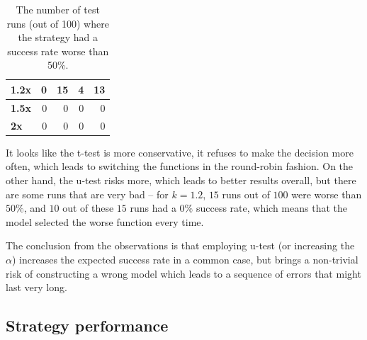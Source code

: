 \begin{table}[h!]
\begin{tabular}{|l|r|r|r|r|}
		\textbf{1.2x}  & 0                                                                                 & 15                                                                                & 4                                                                                 & 13                                                                                \\ \hline
		\textbf{1.5x}  & 0                                                                                 & 0                                                                                 & 0                                                                                 & 0                                                                                 \\ \hline
		\textbf{2x}    & 0                                                                                 & 0                                                                                 & 0                                                                                 & 0                                                                                 \\ \hline
	\end{tabular}
\egroup
\caption{The number of test runs (out of 100) where the strategy had a success rate worse than 50\%.}
\label{tab:strategy_comparison_mean_based_worse_runs}
\end{table}

It looks like the t-test is more conservative, it refuses to make the decision more often, which leads to switching the functions in the round-robin fashion. On the other hand, the u-test risks more, which leads to better results overall, but there are some runs that are very bad -- for $k=1.2$, $15$ runs out of $100$ were worse than $50\%$, and $10$ out of these $15$ runs had a $0\%$ success rate, which means that the model selected the worse function every time.

The conclusion from the observations is that employing u-test (or increasing the $\alpha$) increases the expected success rate in a common case, but brings a non-trivial risk of constructing a wrong model which leads to a sequence of errors that might last very long.

\subsection{Strategy performance}
\label{subsec:strategy_perf}

